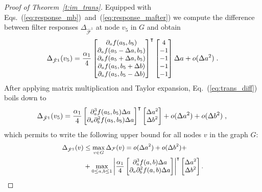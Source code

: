 \documentclass[10pt,journal,compsoc]{IEEEtran}
\newcommand{\hmF}{\hat{\mathcal{F}}}
\begin{document}
\begin{proof}[Proof of Theorem~\ref{t:im_trans}]
		\noindent
		Equipped with Eqs.~(\ref{eq:response_mb})~and~(\ref{eq:response_mafter}) we compute the difference between filter responses $\Delta_{\hmF^1}$
		at node $v_5$ in $G$ and obtain
		\begin{equation}
		\small
		\Delta_{\hmF^1}(v_5) = \frac{\alpha_1}{4}
		\begin{bmatrix}
		\partial_a f(a_5,b_5) \\
		\partial_a f(a_5-\Delta a, b_5) \\
		\partial_a f(a_5+\Delta a, b_5) \\
		\partial_a f(a_5, b_5+\Delta b) \\
		\partial_a f(a_5, b_5-\Delta b) \\
		\end{bmatrix}^\intercal
		\begin{bmatrix}
		4 \\ -1 \\ -1 \\ -1 \\ -1 \\
		\end{bmatrix} \Delta a + o(\Delta a^2) \;.
		\label{eq:trans_diff}
		\end{equation}
		After applying matrix multiplication and Taylor expansion, Eq.~(\ref{eq:trans_diff}) boils down to
		\begin{equation}
		\small
		\Delta_{\hmF^1}(v_5) = \frac{\alpha_1}{4}
		\begin{bmatrix}
		\partial^3_a f(a_5,b_5) \Delta a\\
		\partial_a\partial^2_b f(a_5,b_5) \Delta a\\
		\end{bmatrix}^\intercal
		\begin{bmatrix}
		\Delta a^2 \\
		\Delta b^2 \\
		\end{bmatrix} + o(\Delta a^2) + o(\Delta b^2)\;,\\
		\label{eq:horizontal_trans}
		\end{equation}
		\noindent
		which permits to write the following upper bound for all nodes $v$ in the graph $G$:
		\begin{equation}
		\small
		\begin{aligned}
		\Delta_{\hmF^1} (v) & \leq \max_{v \in G} \Delta_\mathcal{F} (v)  = o(\Delta a^2) + o(\Delta b^2) + \\
		& +
		\max_{0 \leq a,b \leq 1}
		\left| \frac{\alpha_1}{4}
		\begin{bmatrix}
		\partial^3_a f(a,b)\Delta a\\
		\partial_a\partial^2_b f(a,b) \Delta a\\
		\end{bmatrix}
		\right|^\intercal
		\begin{bmatrix}
		\Delta a^2 \\
		\Delta b^2 \\
		\end{bmatrix}. \\
		\end{aligned}
		\label{eq:response_del_trans_res}
		\end{equation}


\end{proof}
\end{document}
